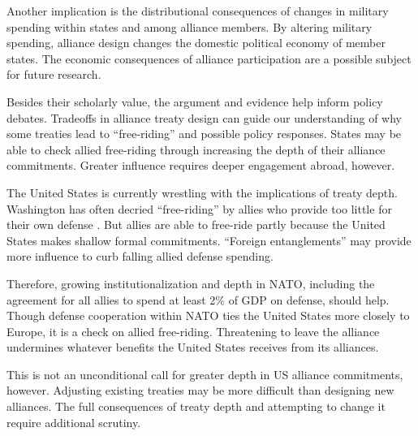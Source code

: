 \documentclass[12pt]{article}
\begin{document}
Another implication is the distributional consequences of changes in military spending within states and among alliance members.  
By altering military spending, alliance design changes the domestic political economy of member states. 
The economic consequences of alliance participation are a possible subject for future research. 


Besides their scholarly value, the argument and evidence help inform policy debates. 
Tradeoffs in alliance treaty design can guide our understanding of why some treaties lead to ``free-riding'' and possible policy responses. 
States may be able to check allied free-riding through increasing the depth of their alliance commitments. 
Greater influence requires deeper engagement abroad, however. 


The United States is currently wrestling with the implications of treaty depth. 
Washington has often decried ``free-riding'' by allies who provide too little for their own defense \citep{Lanoszka2015}. 
But allies are able to free-ride partly because the United States makes shallow formal commitments. 
``Foreign entanglements'' may provide more influence to curb falling allied defense spending. 

 
Therefore, growing institutionalization and depth in NATO, including the agreement for all allies to spend at least 2\% of GDP on defense, should help.
Though defense cooperation within NATO ties the United States more closely to Europe, it is a check on allied free-riding. 
Threatening to leave the alliance undermines whatever benefits the United States receives from its alliances. 

 
This is not an unconditional call for greater depth in US alliance commitments, however. 
Adjusting existing treaties may be more difficult than designing new alliances. 
The full consequences of treaty depth and attempting to change it require additional scrutiny. 

 



\singlespace
 
 
\end{document}
